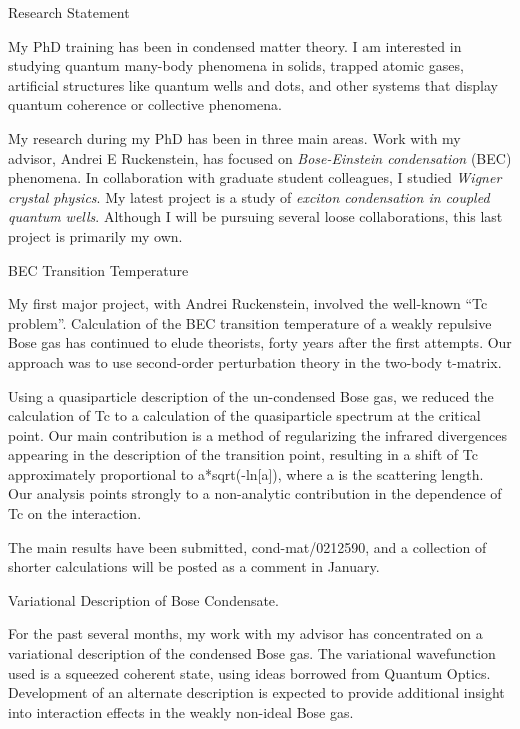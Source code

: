 \documentclass[11pt]{article}
\newcommand{\heading}{\Large}
\begin{document}
\begin{center}
{\sc\LARGE Research Statement}
\end{center}

\vspace{0.5cm}



My PhD training has been in condensed matter theory.  I am interested
in studying quantum many-body phenomena in solids, trapped atomic
gases, artificial structures like quantum wells and dots, and other
systems that display quantum coherence or collective phenomena.

My research during my PhD has been in three main areas.  Work with my
advisor, Andrei E Ruckenstein, has focused on \emph{Bose-Einstein
condensation} (BEC) phenomena. In collaboration with graduate student
colleagues, I studied \emph{Wigner crystal physics}.  My latest
project is a study of \emph{exciton condensation in coupled quantum
wells}.  Although I will be pursuing several loose collaborations,
this last project is primarily my own.


{\heading BEC Transition Temperature}

My first major project, with Andrei Ruckenstein, involved the
well-known ``Tc problem''.  Calculation of the BEC transition
temperature of a weakly repulsive Bose gas has continued to elude
theorists, forty years after the first attempts.  Our approach was to
use second-order perturbation theory in the two-body t-matrix.

Using a quasiparticle description of the un-condensed Bose gas, we
reduced the calculation of Tc to a calculation of the quasiparticle
spectrum at the critical point.  Our main contribution is a method of
regularizing the infrared divergences appearing in the description of
the transition point, resulting in a shift of Tc approximately
proportional to a*sqrt(-ln[a]), where a is the scattering length.
Our analysis points strongly to a non-analytic contribution in the
dependence of Tc on the interaction.

The main results have been submitted, cond-mat/0212590, and a
collection of shorter calculations will be posted as a comment in
January.


{\heading Variational Description of Bose Condensate}.

For the past several months, my work with my advisor has concentrated
on a variational description of the condensed Bose gas.  The
variational wavefunction used is a squeezed coherent state, using
ideas borrowed from Quantum Optics. Development of an alternate
description is expected to provide additional insight into interaction
effects in the weakly non-ideal Bose gas.
\end{document}
